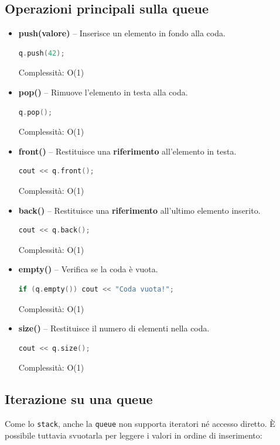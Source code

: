 \subsection{Operazioni principali sulla queue}

\begin{itemize}
	\item \textbf{push(valore)} – Inserisce un elemento in fondo alla coda.
	\begin{lstlisting}[language=C++]
		q.push(42);
	\end{lstlisting}
	Complessità: O(1)
	
	\item \textbf{pop()} – Rimuove l’elemento in testa alla coda.
	\begin{lstlisting}[language=C++]
		q.pop();
	\end{lstlisting}
	Complessità: O(1)
	
	\item \textbf{front()} – Restituisce una \textbf{riferimento} all’elemento in testa.
	\begin{lstlisting}[language=C++]
		cout << q.front();
	\end{lstlisting}
	Complessità: O(1)
	
	\item \textbf{back()} – Restituisce una \textbf{riferimento} all’ultimo elemento inserito.
	\begin{lstlisting}[language=C++]
		cout << q.back();
	\end{lstlisting}
	Complessità: O(1)
	
	\item \textbf{empty()} – Verifica se la coda è vuota.
	\begin{lstlisting}[language=C++]
		if (q.empty()) cout << "Coda vuota!";
	\end{lstlisting}
	Complessità: O(1)
	
	\item \textbf{size()} – Restituisce il numero di elementi nella coda.
	\begin{lstlisting}[language=C++]
		cout << q.size();
	\end{lstlisting}
	Complessità: O(1)
\end{itemize}

\subsection{Iterazione su una queue}

Come lo \texttt{stack}, anche la \texttt{queue} non supporta iteratori né accesso diretto.  
È possibile tuttavia svuotarla per leggere i valori in ordine di inserimento:

